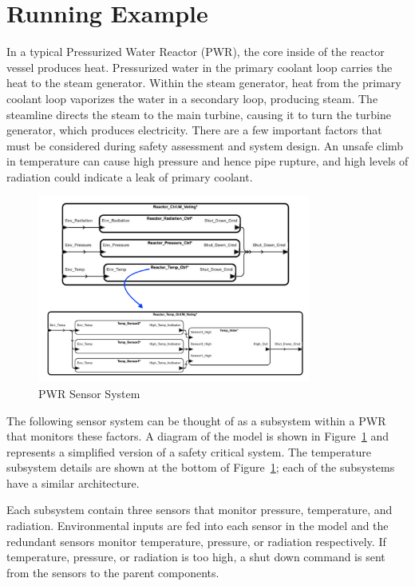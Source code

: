 \section{Running Example}
\label{sec:example}
In a typical Pressurized Water Reactor (PWR), the core inside of the reactor vessel produces heat. Pressurized water in the primary coolant loop carries the heat to the steam generator. Within the steam generator, heat from the primary coolant loop vaporizes the water in a secondary loop, producing steam. The steamline directs the steam to the main turbine, causing it to turn the turbine generator, which produces electricity. There are a few important factors that must be considered during safety assessment and system design. An unsafe climb in temperature can cause high pressure and hence pipe rupture, and high levels of radiation could indicate a leak of primary coolant. 

\begin{figure}[h!]
	\begin{center}
		\includegraphics[width=0.8\textwidth]{images/sensorSysAADL.png}
	\end{center}
	\vspace{-2em}
	\caption{PWR Sensor System}
	\label{fig:sensorSys}
\end{figure}

The following sensor system can be thought of as a subsystem within a PWR that monitors these factors. A diagram of the model is shown in Figure~\ref{fig:sensorSys} and represents a simplified version of a safety critical system. The temperature subsystem details are shown at the bottom of Figure~\ref{fig:sensorSys}; each of the subsystems have a similar architecture.

Each subsystem contain three sensors that monitor pressure, temperature, and radiation. Environmental inputs are fed into each sensor in the model and the redundant sensors monitor temperature, pressure, or radiation respectively. If temperature, pressure, or radiation is too high, a shut down command is sent from the sensors to the parent components. 

